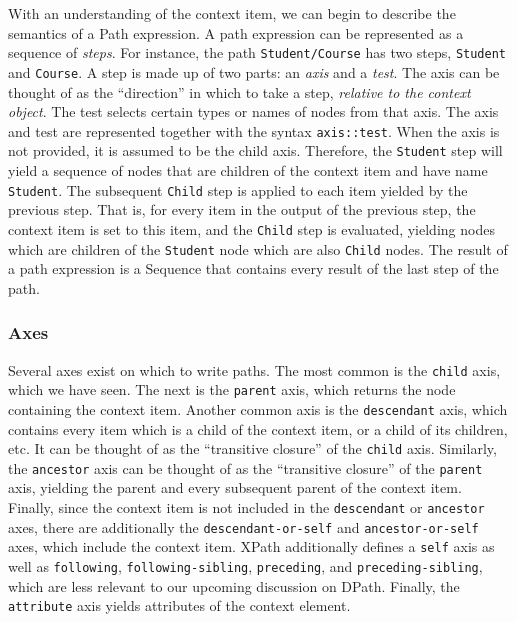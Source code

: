 \documentclass{scrartcl}
\begin{document}
With an understanding of the context item, we can begin to describe the
semantics of a Path expression. A path expression can be represented as a
sequence of \emph{steps}. For instance, the path \texttt{Student/Course} has two
steps, \texttt{Student} and \texttt{Course}. A step is made up of two parts: an
\emph{axis} and a \emph{test}. The axis can be thought of as the ``direction''
in which to take a step, \emph{relative to the context object}. The test selects
certain types or names of nodes from that axis. The axis and test are
represented together with the syntax \texttt{axis::test}. When the axis is not
provided, it is assumed to be the child axis. Therefore, the \texttt{Student}
step will yield a sequence of nodes that are children of the context item and
have name \texttt{Student}. The subsequent \texttt{Child} step is applied to
each item yielded by the previous step. That is, for every item in the output of
the previous step, the context item is set to this item, and the \texttt{Child}
step is evaluated, yielding nodes which are children of the \texttt{Student}
node which are also \texttt{Child} nodes. The result of a path expression is a
Sequence that contains every result of the last step of the path.

\subsubsection{Axes}

Several axes exist on which to write paths. The most common is the
\texttt{child} axis, which we have seen. The next is the \texttt{parent} axis,
which returns the node containing the context item. Another common axis is the
\texttt{descendant} axis, which contains every item which is a child of the
context item, or a child of its children, etc. It can be thought of as the
``transitive closure'' of the \texttt{child} axis. Similarly, the
\texttt{ancestor} axis can be thought of as the ``transitive closure'' of the
\texttt{parent} axis, yielding the parent and every subsequent parent of the
context item. Finally, since the context item is not included in the
\texttt{descendant} or \texttt{ancestor} axes, there are additionally the
\texttt{descendant-or-self} and \texttt{ancestor-or-self} axes, which include
the context item. XPath additionally defines a \texttt{self} axis as well as
\texttt{following}, \texttt{following-sibling}, \texttt{preceding}, and
\texttt{preceding-sibling}, which are less relevant to our upcoming discussion
on DPath. Finally, the \texttt{attribute} axis yields attributes of the context
element.
\end{document}
